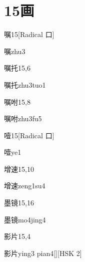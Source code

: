 
\section*{15画}

\begin{entry}{嘱}{15}[Radical 口]
  \begin{phonetics}{嘱}{zhu3}
  \end{phonetics}
\end{entry}

\begin{entry}{嘱托}{15,6}
  \begin{phonetics}{嘱托}{zhu3tuo1}
  \end{phonetics}
\end{entry}

\begin{entry}{嘱咐}{15,8}
  \begin{phonetics}{嘱咐}{zhu3fu5}
  \end{phonetics}
\end{entry}

\begin{entry}{噎}{15}[Radical 口]
  \begin{phonetics}{噎}{ye1}
  \end{phonetics}
\end{entry}

\begin{entry}{增速}{15,10}
  \begin{phonetics}{增速}{zeng1su4}
  \end{phonetics}
\end{entry}

\begin{entry}{墨镜}{15,16}
  \begin{phonetics}{墨镜}{mo4jing4}
  \end{phonetics}
\end{entry}

\begin{entry}{影片}{15,4}
  \begin{phonetics}{影片}{ying3 pian4}[][HSK 2]
  \end{phonetics}
\end{entry}


